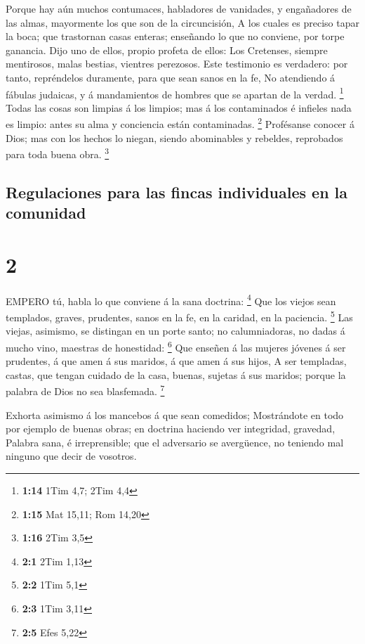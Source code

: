  Porque hay aún muchos contumaces, habladores de vanidades,
y engañadores de las almas, mayormente los que son de la circuncisión,
 A los cuales es preciso tapar la boca; que trastornan
casas enteras; enseñando lo que no conviene, por torpe ganancia.
 Dijo uno de ellos, propio profeta de ellos: Los Cretenses,
siempre mentirosos, malas bestias, vientres perezosos. 
Este testimonio es verdadero: por tanto, repréndelos duramente, para que
sean sanos en la fe,  No atendiendo á fábulas judaicas, y á
mandamientos de hombres que se apartan de la verdad. \footnote{\textbf{1:14}
  1Tim 4,7; 2Tim 4,4}  Todas las cosas son limpias á los
limpios; mas á los contaminados é infieles nada es limpio: antes su alma
y conciencia están contaminadas. \footnote{\textbf{1:15} Mat 15,11; Rom
  14,20}  Profésanse conocer á Dios; mas con los hechos lo
niegan, siendo abominables y rebeldes, reprobados para toda buena obra.
\footnote{\textbf{1:16} 2Tim 3,5}

\hypertarget{regulaciones-para-las-fincas-individuales-en-la-comunidad}{%
\subsection{Regulaciones para las fincas individuales en la
comunidad}\label{regulaciones-para-las-fincas-individuales-en-la-comunidad}}

\hypertarget{section-1}{%
\section{2}\label{section-1}}

 EMPERO tú, habla lo que conviene á la sana doctrina:
\footnote{\textbf{2:1} 2Tim 1,13}  Que los viejos sean
templados, graves, prudentes, sanos en la fe, en la caridad, en la
paciencia. \footnote{\textbf{2:2} 1Tim 5,1}  Las viejas,
asimismo, se distingan en un porte santo; no calumniadoras, no dadas á
mucho vino, maestras de honestidad: \footnote{\textbf{2:3} 1Tim 3,11}
 Que enseñen á las mujeres jóvenes á ser prudentes, á que
amen á sus maridos, á que amen á sus hijos,  A ser
templadas, castas, que tengan cuidado de la casa, buenas, sujetas á sus
maridos; porque la palabra de Dios no sea blasfemada. \footnote{\textbf{2:5}
  Efes 5,22}

 Exhorta asimismo á los mancebos á que sean comedidos;
 Mostrándote en todo por ejemplo de buenas obras; en
doctrina haciendo ver integridad, gravedad,  Palabra sana, é
irreprensible; que el adversario se avergüence, no teniendo mal ninguno
que decir de vosotros.

